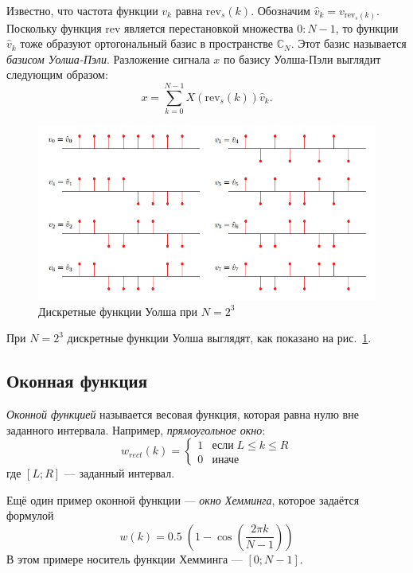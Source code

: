 \documentclass{matmex-diploma-custom}
\begin{document}
Известно, что частота функции $v_k$ равна $\mathrm{rev}_s(k)$. Обозначим
$\hat{v}_k = v_{\mathrm{rev}_s(k)}$. Поскольку функция $\mathrm{rev}$ является 
перестановкой множества $0:N-1$, то функции $\hat{v}_k$ тоже образуют
ортогональный базис
в пространстве $\mathbb{C}_N$. Этот базис называется \emph{базисом Уолша-Пэли}.
Разложение сигнала $x$ по базису Уолша-Пэли выглядит следующим образом:
$$
  x = \sum_{k=0}^{N-1} X(\mathrm{rev}_s(k)) \hat{v}_k.
$$

\begin{figure}
    \centering
    \includegraphics[width=\textwidth]{../images/walsh.png}
    \caption{Дискретные функции Уолша при $N=2^3$}
    \label{pic:функции_Уолша}
\end{figure}
При $N=2^3$ дискретные функции Уолша выглядят, как показано на рис.~\ref{pic:функции_Уолша}.





\subsection{Оконная функция}
\emph{Оконной функцией} называется весовая функция, которая равна нулю вне заданного
интервала. Например, \emph{прямоугольное окно}:
$$
w_{rect}(k) = 
\left\{ \begin{array}{ll}
  1 & \textrm{если} \; L \leq k \leq R  \\
  0 & \textrm{иначе}
\end{array} \right.
$$
где $[L;R]$ --- заданный интервал.

Ещё один пример оконной функции --- \emph{окно Хемминга}, которое задаётся формулой
$$
    w(k) = 0.5\; \left(1 - \cos \left ( \frac{2 \pi k}{N-1} \right) \right) 
$$
В этом примере носитель функции Хемминга --- $[0;N-1]$.
\end{document}
